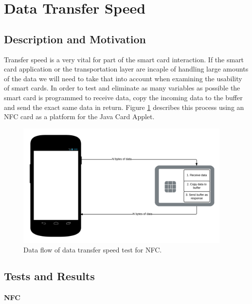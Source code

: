 \section{Data Transfer Speed}
\subsection{Description and Motivation}
Transfer speed is a very vital for part of the smart card interaction. If the smart card application or the transportation layer are incaple of handling large amounts of the data we will need to take that into account when examining the usability of smart cards. In order to test and eliminate as many variables as possible the smart card is programmed to receive data, copy the incoming data to the buffer and send the exact same data in return. Figure \ref{fig:nfcDataflowTest} describes this process using an NFC card as a platform for the Java Card Applet.

\begin{figure}[h!]
  \caption{Data flow of data transfer speed test for NFC.}
  \label{fig:nfcDataflowTest}
  \centering
    \includegraphics[width=0.95\textwidth]{images/NFCTransferTest.png}
\end{figure}

\subsection{Tests and Results}
\paragraph{NFC}\mbox{}\\



